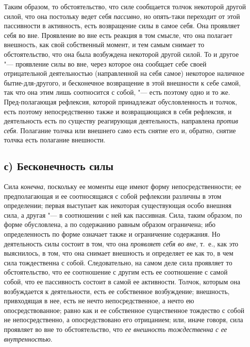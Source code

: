 Таким образом, то обстоятельство, что силе сообщается толчок некоторой
другой силой, что она постольку ведет себя
{\em пассивно}, но опять-таки переходит от этой
пассивности в активность, есть возвращение силы в самое себя. Она проявляет
себя во вне. Проявление во вне есть реакция в том смысле, что она полагает
внешность, как свой собственный момент, и тем самым снимает то
обстоятельство, что она была возбуждена некоторой другой силой. То и другое
"--- проявление силы во вне, через которое она сообщает себе своей
отрицательной деятельностью (направленной на себя самое) некоторое наличное
бытие-для-другого, и бесконечное возвращение в этой внешности к себе самой,
так что она этим лишь соотносится с собой, "--- есть поэтому одно и то же.
Пред-полагающая рефлексия, которой принадлежат обусловленность и толчок,
есть поэтому непосредственно также и возвращающаяся в себя рефлексия, и
деятельность есть по существу реагирующая деятельность, направлена
{\em против себя}. Полагание толчка или внешнего само
есть снятие его и, обратно, снятие толчка есть полагание внешности.


\subsection[с) Бесконечность силы]{с) Бесконечность силы}

Сила {\em конечна},
поскольку ее моменты еще имеют форму непосредственности; ее предполагающая
и ее соотносящаяся с собой рефлексии различны в этом определении; первая
выступает как некоторая существующая особо внешняя сила, а другая "--- в
соотношении с ней как пассивная. Сила, таким образом, по форме обусловлена,
а по содержанию равным образом ограничена; ибо определенность по форме
означает также и ограничение содержания. Но деятельность силы состоит в
том, что она {\em проявляет себя во вне}, т.~е., как
это выяснилось, в том, что она снимает внешность и определяет ее как то, в
чем сила тождественна с собой. Следовательно, на самом деле сила проявляет
то обстоятельство, что ее соотношение с другим есть ее соотношение с самой
собой, что ее пассивность состоит в самой ее активности. Толчок, которым
она возбуждается к деятельности, есть ее собственное возбуждение;
внешность, привходящая в нее, есть не нечто непосредственное, а нечто ею
опосредствованное; равно как и ее собственное существенное тождество с
собой не непосредственно, а опосредствовано его отрицанием; или, иначе
говоря, сила проявляет во вне то обстоятельство, что
{\em ее внешность тождественна с ее внутренностью}.


